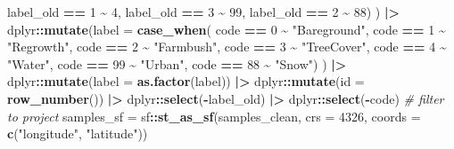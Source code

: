 \documentclass[
]{article}
\newenvironment{Shaded}{\begin{snugshade}}{\end{snugshade}}
\newcommand{\AttributeTok}[1]{\textcolor[rgb]{0.13,0.29,0.53}{#1}}
\newcommand{\CommentTok}[1]{\textcolor[rgb]{0.56,0.35,0.01}{\textit{#1}}}
\newcommand{\DecValTok}[1]{\textcolor[rgb]{0.00,0.00,0.81}{#1}}
\newcommand{\FunctionTok}[1]{\textcolor[rgb]{0.13,0.29,0.53}{\textbf{#1}}}
\newcommand{\NormalTok}[1]{#1}
\newcommand{\OtherTok}[1]{\textcolor[rgb]{0.56,0.35,0.01}{#1}}
\newcommand{\SpecialCharTok}[1]{\textcolor[rgb]{0.81,0.36,0.00}{\textbf{#1}}}
\newcommand{\StringTok}[1]{\textcolor[rgb]{0.31,0.60,0.02}{#1}}
\begin{document}
\begin{Shaded}
\begin{Highlighting}[]
\NormalTok{    label\_old }\SpecialCharTok{==} \StringTok{\textquotesingle{}1\textquotesingle{}} \SpecialCharTok{\textasciitilde{}} \DecValTok{4}\NormalTok{, }
\NormalTok{    label\_old }\SpecialCharTok{==} \StringTok{\textquotesingle{}3\textquotesingle{}} \SpecialCharTok{\textasciitilde{}} \DecValTok{99}\NormalTok{, }
\NormalTok{    label\_old }\SpecialCharTok{==} \StringTok{\textquotesingle{}2\textquotesingle{}} \SpecialCharTok{\textasciitilde{}} \DecValTok{88}\NormalTok{)}
\NormalTok{    ) }\SpecialCharTok{|\textgreater{}}
\NormalTok{  dplyr}\SpecialCharTok{::}\FunctionTok{mutate}\NormalTok{(}\AttributeTok{label =} \FunctionTok{case\_when}\NormalTok{(}
\NormalTok{    code }\SpecialCharTok{==} \StringTok{\textquotesingle{}0\textquotesingle{}}  \SpecialCharTok{\textasciitilde{}} \StringTok{"Bareground"}\NormalTok{, }
\NormalTok{    code }\SpecialCharTok{==} \StringTok{\textquotesingle{}1\textquotesingle{}}  \SpecialCharTok{\textasciitilde{}} \StringTok{"Regrowth"}\NormalTok{, }
\NormalTok{    code }\SpecialCharTok{==} \StringTok{\textquotesingle{}2\textquotesingle{}}  \SpecialCharTok{\textasciitilde{}} \StringTok{"Farmbush"}\NormalTok{, }
\NormalTok{    code }\SpecialCharTok{==} \StringTok{\textquotesingle{}3\textquotesingle{}}  \SpecialCharTok{\textasciitilde{}} \StringTok{"TreeCover"}\NormalTok{, }
\NormalTok{    code }\SpecialCharTok{==} \StringTok{\textquotesingle{}4\textquotesingle{}}  \SpecialCharTok{\textasciitilde{}} \StringTok{"Water"}\NormalTok{, }
\NormalTok{    code }\SpecialCharTok{==} \StringTok{\textquotesingle{}99\textquotesingle{}} \SpecialCharTok{\textasciitilde{}} \StringTok{"Urban"}\NormalTok{, }
\NormalTok{    code }\SpecialCharTok{==} \StringTok{\textquotesingle{}88\textquotesingle{}} \SpecialCharTok{\textasciitilde{}} \StringTok{"Snow"}\NormalTok{)}
\NormalTok{    ) }\SpecialCharTok{|\textgreater{}} 
\NormalTok{  dplyr}\SpecialCharTok{::}\FunctionTok{mutate}\NormalTok{(}\AttributeTok{label =} \FunctionTok{as.factor}\NormalTok{(label)) }\SpecialCharTok{|\textgreater{}}
\NormalTok{  dplyr}\SpecialCharTok{::}\FunctionTok{mutate}\NormalTok{(}\AttributeTok{id =} \FunctionTok{row\_number}\NormalTok{()) }\SpecialCharTok{|\textgreater{}} 
\NormalTok{  dplyr}\SpecialCharTok{::}\FunctionTok{select}\NormalTok{(}\SpecialCharTok{{-}}\NormalTok{label\_old) }\SpecialCharTok{|\textgreater{}}
\NormalTok{  dplyr}\SpecialCharTok{::}\FunctionTok{select}\NormalTok{(}\SpecialCharTok{{-}}\NormalTok{code)}
\CommentTok{\# filter to project}
\NormalTok{samples\_sf       }\OtherTok{=}\NormalTok{ sf}\SpecialCharTok{::}\FunctionTok{st\_as\_sf}\NormalTok{(samples\_clean, }\AttributeTok{crs =} \DecValTok{4326}\NormalTok{, }\AttributeTok{coords =} \FunctionTok{c}\NormalTok{(}\StringTok{"longitude"}\NormalTok{, }\StringTok{"latitude"}\NormalTok{))}

\end{Highlighting}
\end{Shaded}
\end{document}
